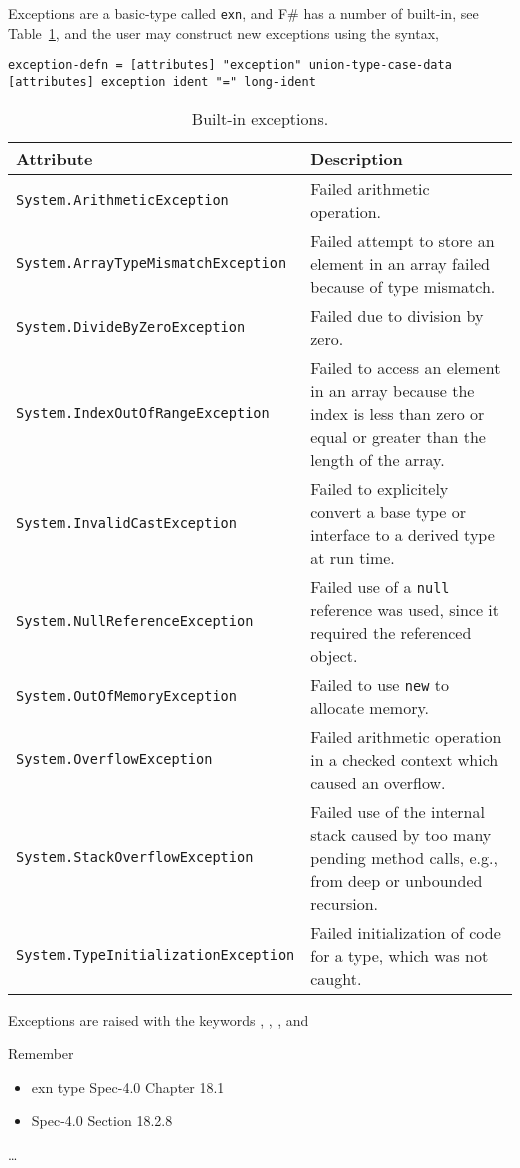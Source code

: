Exceptions are a basic-type called \lstinline!exn!, and F\# has a number of built-in, see Table~\ref{tab:exceptions}, and the user may construct new exceptions using the syntax,
%
\begin{lstlisting}[language=ebnf]
exception-defn = [attributes] "exception" union-type-case-data [attributes] exception ident "=" long-ident
\end{lstlisting}
\begin{table}
  \centering
  \begin{tabularx}{\linewidth}{|l|X|}
    \hline
    Attribute & Description\\
    \hline
    \lstinline!System.ArithmeticException! & Failed arithmetic operation.\\
   \hline
    \lstinline!System.ArrayTypeMismatchException! & Failed attempt to store an element in an array failed because of type mismatch.\\
   \hline
    \lstinline!System.DivideByZeroException! & Failed due to division by zero.\\
   \hline
    \lstinline!System.IndexOutOfRangeException! & Failed to access an element in an array because the index is less than zero or equal or greater than the length of the array.\\
   \hline
    \lstinline!System.InvalidCastException! & Failed to explicitely convert a base type or interface to a derived type at run time.\\
   \hline
    \lstinline!System.NullReferenceException! & Failed use of a \lstinline!null! reference was used, since it required the referenced object.\\
   \hline
    \lstinline!System.OutOfMemoryException! & Failed to use \lstinline!new! to allocate memory.\\ 
   \hline
    \lstinline!System.OverflowException! & Failed arithmetic operation in a checked context which caused an overflow.\\
   \hline
    \lstinline!System.StackOverflowException ! & Failed use of the internal stack caused by too many pending method calls, e.g., from deep or unbounded recursion.\\
   \hline
    \lstinline!System.TypeInitializationException! & Failed initialization of code for a type, which was not caught.\\
   \hline
  \end{tabularx}
  \caption{Built-in exceptions.}
  \label{tab:exceptions}
\end{table}

Exceptions are raised with the keywords , , , and 

%
%

Remember
\begin{itemize}
\item exn type Spec-4.0 Chapter 18.1
\item Spec-4.0 Section 18.2.8
\end{itemize}
\dots 



